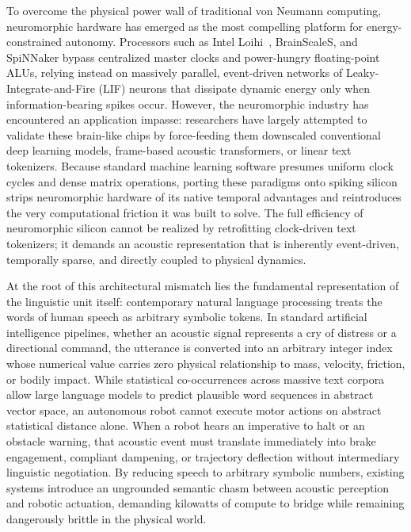 \documentclass[journal,twocolumn]{IEEEtran}
\begin{document}
To overcome the physical power wall of traditional von Neumann computing, neuromorphic hardware has emerged as the most compelling platform for energy-constrained autonomy. Processors such as Intel Loihi~\cite{davies2021}, BrainScaleS, and SpiNNaker bypass centralized master clocks and power-hungry floating-point ALUs, relying instead on massively parallel, event-driven networks of Leaky-Integrate-and-Fire (LIF) neurons that dissipate dynamic energy only when information-bearing spikes occur. However, the neuromorphic industry has encountered an application impasse: researchers have largely attempted to validate these brain-like chips by force-feeding them downscaled conventional deep learning models, frame-based acoustic transformers, or linear text tokenizers. Because standard machine learning software presumes uniform clock cycles and dense matrix operations, porting these paradigms onto spiking silicon strips neuromorphic hardware of its native temporal advantages and reintroduces the very computational friction it was built to solve. The full efficiency of neuromorphic silicon cannot be realized by retrofitting clock-driven text tokenizers; it demands an acoustic representation that is inherently event-driven, temporally sparse, and directly coupled to physical dynamics.

At the root of this architectural mismatch lies the fundamental representation of the linguistic unit itself: contemporary natural language processing treats the words of human speech as arbitrary symbolic tokens. In standard artificial intelligence pipelines, whether an acoustic signal represents a cry of distress or a directional command, the utterance is converted into an arbitrary integer index whose numerical value carries zero physical relationship to mass, velocity, friction, or bodily impact. While statistical co-occurrences across massive text corpora allow large language models to predict plausible word sequences in abstract vector space, an autonomous robot cannot execute motor actions on abstract statistical distance alone. When a robot hears an imperative to halt or an obstacle warning, that acoustic event must translate immediately into brake engagement, compliant dampening, or trajectory deflection without intermediary linguistic negotiation. By reducing speech to arbitrary symbolic numbers, existing systems introduce an ungrounded semantic chasm between acoustic perception and robotic actuation, demanding kilowatts of compute to bridge while remaining dangerously brittle in the physical world.
\end{document}
